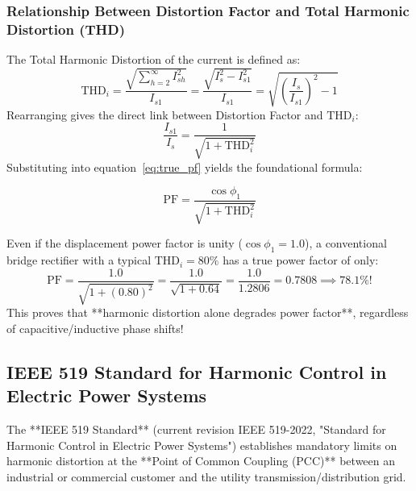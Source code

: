\documentclass[11pt,a4paper]{article}
\begin{document}
\subsubsection{Relationship Between Distortion Factor and Total Harmonic Distortion (THD)}
The Total Harmonic Distortion of the current is defined as:
\begin{equation}
\text{THD}_i = \frac{\sqrt{\sum_{h=2}^\infty I_{sh}^2}}{I_{s1}} = \frac{\sqrt{I_s^2 - I_{s1}^2}}{I_{s1}} = \sqrt{\left(\frac{I_s}{I_{s1}}\right)^2 - 1}
\end{equation}
Rearranging gives the direct link between Distortion Factor and $\text{THD}_i$:
\begin{equation}
\frac{I_{s1}}{I_s} = \frac{1}{\sqrt{1 + \text{THD}_i^2}}
\end{equation}
Substituting into equation~\eqref{eq:true_pf} yields the foundational formula:
\begin{formulabox}
\begin{equation}
\text{PF} = \frac{\cos\phi_1}{\sqrt{1 + \text{THD}_i^2}}
\label{eq:pf_from_thd}
\end{equation}
\end{formulabox}
\begin{conceptbox}
Even if the displacement power factor is unity ($\cos\phi_1 = 1.0$), a conventional bridge rectifier with a typical $\text{THD}_i = 80\%$ has a true power factor of only:
\begin{equation}
\text{PF} = \frac{1.0}{\sqrt{1 + (0.80)^2}} = \frac{1.0}{\sqrt{1 + 0.64}} = \frac{1.0}{1.2806} = 0.7808 \implies 78.1\%!
\end{equation}
This proves that **harmonic distortion alone degrades power factor**, regardless of capacitive/inductive phase shifts!
\end{conceptbox}

\subsection{IEEE 519 Standard for Harmonic Control in Electric Power Systems}

The **IEEE 519 Standard** (current revision IEEE 519-2022, "Standard for Harmonic Control in Electric Power Systems") establishes mandatory limits on harmonic distortion at the **Point of Common Coupling (PCC)** between an industrial or commercial customer and the utility transmission/distribution grid.
\end{document}
